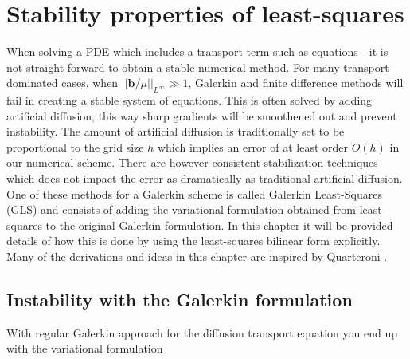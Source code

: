 
\chapter{Stability properties of least-squares} %

\label{chap:newTheory} %


When solving a PDE which includes a transport term such as equations - it is not straight forward to obtain a stable numerical method. For many transport-dominated cases, when $||\mathbf{b}/\mu||_{L^{\infty}} \gg 1$, Galerkin and finite difference methods will fail in creating a stable system of equations. This is often solved by adding artificial diffusion, this way sharp gradients will be smoothened out and prevent instability. The amount of artificial diffusion is traditionally set to be proportional to the grid size $h$ which implies an error of at least order $O(h)$ in our numerical scheme. There are however consistent stabilization techniques which does not impact the error as dramatically as traditional artificial diffusion. One of these methods for a Galerkin scheme is called Galerkin Least-Squares (GLS) and consists of adding the variational formulation obtained from least-squares to the original Galerkin formulation. In this chapter it will be provided details of how this is done by using the least-squares bilinear form explicitly. Many of the derivations and ideas in this chapter are inspired by Quarteroni \cite{Quarteroni}. 

\section{Instability with the Galerkin formulation}

With regular Galerkin approach for the diffusion transport equation you end up with the variational formulation

